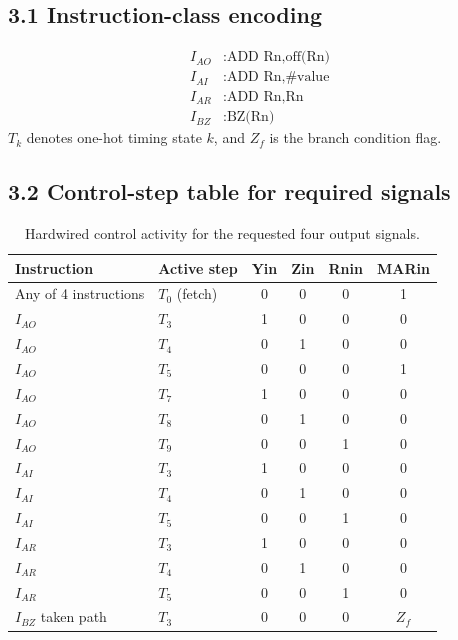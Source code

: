 \documentclass{article}
\begin{document}
\subsection*{3.1 Instruction-class encoding}
\begin{align*}
I_{AO} &: \text{ADD Rn,off(Rn)} \\
I_{AI} &: \text{ADD Rn,\#value} \\
I_{AR} &: \text{ADD Rn,Rn} \\
I_{BZ} &: \text{BZ(Rn)}
\end{align*}
\(T_k\) denotes one-hot timing state \(k\), and \(Z_f\) is the branch condition flag.

\subsection*{3.2 Control-step table for required signals}
\begin{table}[H]
\centering
\renewcommand{\arraystretch}{1.25}
\begin{tabular}{@{}llcccc@{}}
\toprule
Instruction & Active step & Yin & Zin & Rnin & MARin \\
\midrule
Any of 4 instructions & \(T_0\) (fetch) & 0 & 0 & 0 & 1 \\
\midrule
\(I_{AO}\) & \(T_3\) & 1 & 0 & 0 & 0 \\
\(I_{AO}\) & \(T_4\) & 0 & 1 & 0 & 0 \\
\(I_{AO}\) & \(T_5\) & 0 & 0 & 0 & 1 \\
\(I_{AO}\) & \(T_7\) & 1 & 0 & 0 & 0 \\
\(I_{AO}\) & \(T_8\) & 0 & 1 & 0 & 0 \\
\(I_{AO}\) & \(T_9\) & 0 & 0 & 1 & 0 \\
\midrule
\(I_{AI}\) & \(T_3\) & 1 & 0 & 0 & 0 \\
\(I_{AI}\) & \(T_4\) & 0 & 1 & 0 & 0 \\
\(I_{AI}\) & \(T_5\) & 0 & 0 & 1 & 0 \\
\midrule
\(I_{AR}\) & \(T_3\) & 1 & 0 & 0 & 0 \\
\(I_{AR}\) & \(T_4\) & 0 & 1 & 0 & 0 \\
\(I_{AR}\) & \(T_5\) & 0 & 0 & 1 & 0 \\
\midrule
\(I_{BZ}\) taken path & \(T_3\) & 0 & 0 & 0 & \(Z_f\) \\
\bottomrule
\end{tabular}
\caption{Hardwired control activity for the requested four output signals.}
\end{table}
\end{document}
